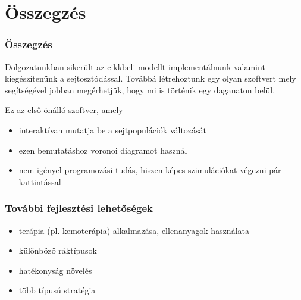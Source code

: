 \section{Összegzés}
\begin{frame}
\frametitle{Összegzés}

\begin{block}{}
Dolgozatunkban sikerült az \cite{archetti2016cooperation} cikkbeli modellt implementálnunk valamint kiegészítenünk a sejtosztódással. Továbbá létrehoztunk egy olyan szoftvert mely segítségével jobban megérhetjük, hogy mi is történik egy daganaton belül.
\end{block}

\pause
\begin{block}{Ez az első önálló szoftver, amely}
\begin{itemize}
	\item interaktívan mutatja be a sejtpopulációk változását
	\pause
	\item ezen bemutatáshoz voronoi diagramot használ
	\pause
	\item nem igényel programozási tudás, hiszen képes szimulációkat végezni pár kattintással
\end{itemize}
\end{block}
\end{frame}

\begin{frame}
\frametitle{További fejlesztési lehetőségek}
\begin{itemize}
	\item terápia (pl. kemoterápia) alkalmazása, ellenanyagok használata
	\pause
	\item különböző ráktípusok
	\pause
	\item hatékonyság növelés
	\pause
	\item több típusú stratégia
\end{itemize}

\end{frame}